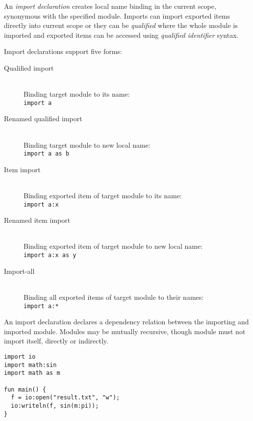 An \emph{import declaration} creates local name binding in the current scope, synonymous with the specified module. Imports can import exported items directly into current scope or they can be \emph{qualified} where the whole module is imported and exported items can be accessed using \emph{qualified identifier} syntax.

Import declarations support five forms:

\begin{description}
  \item [Qualified import] \hfill \\
    Binding target module to its name: \\
    \lstinline{import a}
  \item [Renamed qualified import] \hfill \\
    Binding target module to new local name: \\
    \lstinline{import a as b}
  \item [Item import] \hfill \\
    Binding exported item of target module to its name: \\
    \lstinline{import a:x}
  \item [Renamed item import] \hfill \\
    Binding exported item of target module to new local name: \\
    \lstinline{import a:x as y}
  \item [Import-all] \hfill \\
    Binding all exported items of target module to their names: \\
    \lstinline{import a:*}
\end{description}

An import declaration declares a dependency relation between the importing and imported module. Modules may be mutually recursive, though module must not import itself, directly or indirectly.

\begin{example}
\begin{lstlisting}
import io
import math:sin
import math as m

fun main() {
  f = io:open("result.txt", "w");
  io:writeln(f, sin(m:pi));
}
\end{lstlisting}
\end{example}
